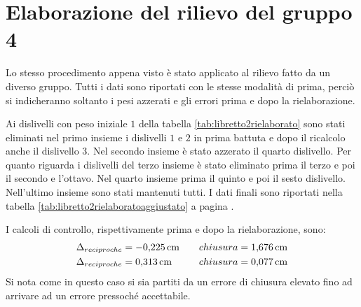 \section{Elaborazione del rilievo del gruppo 4}
Lo stesso procedimento appena visto è stato applicato al rilievo fatto da un diverso gruppo. 
Tutti i dati sono riportati con le stesse modalità di prima, perciò si indicheranno soltanto i pesi azzerati e gli errori prima e dopo la rielaborazione. 

Ai dislivelli con peso iniziale $1$ della tabella \ref{tab:libretto2rielaborato} sono stati eliminati nel primo insieme i dislivelli $1$ e $2$ in prima battuta e dopo il ricalcolo anche il dislivello $3$. 
Nel secondo insieme è stato azzerato il quarto dislivello.
Per quanto riguarda i dislivelli del terzo insieme è stato eliminato prima il terzo e poi il secondo e l'ottavo.
Nel quarto insieme prima il quinto e poi il sesto dislivello.
Nell'ultimo insieme sono stati mantenuti tutti. 
I dati finali sono riportati nella tabella \ref{tab:libretto2rielaboratoaggiustato} a pagina \pageref{tab:libretto2rielaboratoaggiustato}. 

I calcoli di controllo, rispettivamente prima e dopo la rielaborazione, sono: 
\begin{align*}
\Delta_{reciproche} &= \SI{-0.225}{\centi\metre} \quad & chiusura = \SI{1.676}{\centi\metre} \\
\Delta_{reciproche} &= \SI{0.313}{\centi\metre} \quad & chiusura = \SI{0.077}{\centi\metre}
\end{align*}
Si nota come in questo caso si sia partiti da un errore di chiusura elevato fino ad arrivare ad un errore pressoché accettabile.





